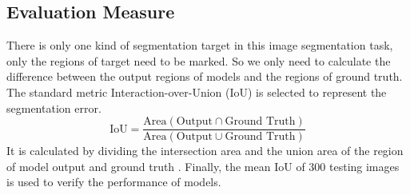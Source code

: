\subsection{Evaluation Measure}
There is only one kind of segmentation target in this image segmentation task, only the regions of target need to be marked. So we only need to calculate the difference between the output regions of models and the regions of ground truth. The standard metric Interaction-over-Union (IoU) is selected to represent the segmentation error.
\begin{equation*}
    \text{IoU} = \frac{\text{Area}(\text{Output} \cap \text{Ground Truth})}{\text{Area}(\text{Output} \cup \text{Ground Truth})}
\end{equation*}
It is calculated by dividing the intersection area and the union area of the region of model output and ground truth . Finally, the mean IoU of $300$ testing images is used to verify the performance of models.
